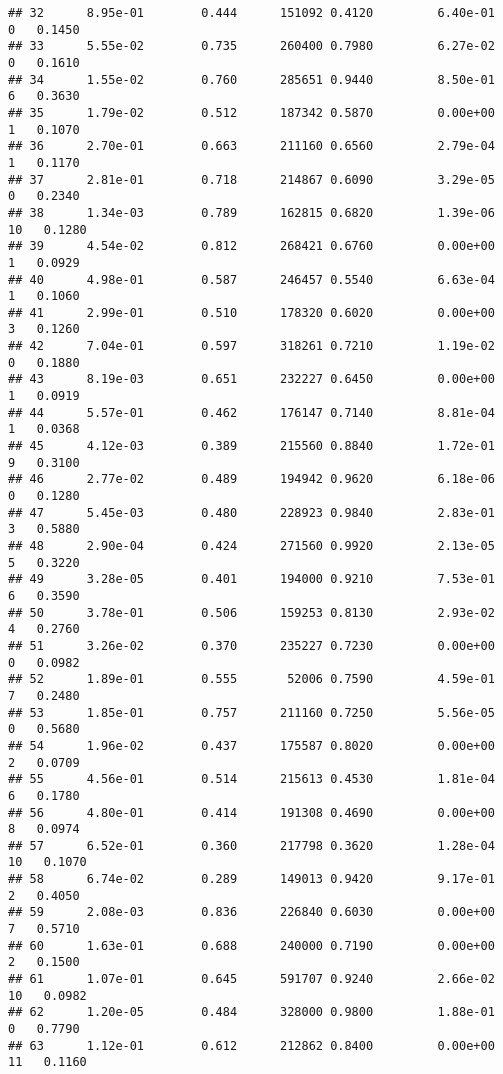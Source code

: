 \documentclass[
]{article}
\begin{document}
\begin{verbatim}
## 32      8.95e-01        0.444      151092 0.4120         6.40e-01   0   0.1450
## 33      5.55e-02        0.735      260400 0.7980         6.27e-02   0   0.1610
## 34      1.55e-02        0.760      285651 0.9440         8.50e-01   6   0.3630
## 35      1.79e-02        0.512      187342 0.5870         0.00e+00   1   0.1070
## 36      2.70e-01        0.663      211160 0.6560         2.79e-04   1   0.1170
## 37      2.81e-01        0.718      214867 0.6090         3.29e-05   0   0.2340
## 38      1.34e-03        0.789      162815 0.6820         1.39e-06  10   0.1280
## 39      4.54e-02        0.812      268421 0.6760         0.00e+00   1   0.0929
## 40      4.98e-01        0.587      246457 0.5540         6.63e-04   1   0.1060
## 41      2.99e-01        0.510      178320 0.6020         0.00e+00   3   0.1260
## 42      7.04e-01        0.597      318261 0.7210         1.19e-02   0   0.1880
## 43      8.19e-03        0.651      232227 0.6450         0.00e+00   1   0.0919
## 44      5.57e-01        0.462      176147 0.7140         8.81e-04   1   0.0368
## 45      4.12e-03        0.389      215560 0.8840         1.72e-01   9   0.3100
## 46      2.77e-02        0.489      194942 0.9620         6.18e-06   0   0.1280
## 47      5.45e-03        0.480      228923 0.9840         2.83e-01   3   0.5880
## 48      2.90e-04        0.424      271560 0.9920         2.13e-05   5   0.3220
## 49      3.28e-05        0.401      194000 0.9210         7.53e-01   6   0.3590
## 50      3.78e-01        0.506      159253 0.8130         2.93e-02   4   0.2760
## 51      3.26e-02        0.370      235227 0.7230         0.00e+00   0   0.0982
## 52      1.89e-01        0.555       52006 0.7590         4.59e-01   7   0.2480
## 53      1.85e-01        0.757      211160 0.7250         5.56e-05   0   0.5680
## 54      1.96e-02        0.437      175587 0.8020         0.00e+00   2   0.0709
## 55      4.56e-01        0.514      215613 0.4530         1.81e-04   6   0.1780
## 56      4.80e-01        0.414      191308 0.4690         0.00e+00   8   0.0974
## 57      6.52e-01        0.360      217798 0.3620         1.28e-04  10   0.1070
## 58      6.74e-02        0.289      149013 0.9420         9.17e-01   2   0.4050
## 59      2.08e-03        0.836      226840 0.6030         0.00e+00   7   0.5710
## 60      1.63e-01        0.688      240000 0.7190         0.00e+00   2   0.1500
## 61      1.07e-01        0.645      591707 0.9240         2.66e-02  10   0.0982
## 62      1.20e-05        0.484      328000 0.9800         1.88e-01   0   0.7790
## 63      1.12e-01        0.612      212862 0.8400         0.00e+00  11   0.1160

\end{verbatim}
\end{document}
